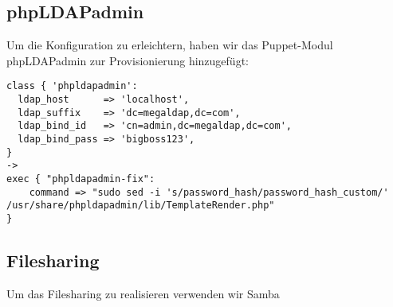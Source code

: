 \documentclass[main.tex]{subfiles}
\begin{document}
\subsection{phpLDAPadmin}
Um die Konfiguration zu erleichtern, haben wir das Puppet-Modul phpLDAPadmin zur 
Provisionierung hinzugefügt:

\begin{lstlisting}  
class { 'phpldapadmin':
  ldap_host      => 'localhost',
  ldap_suffix    => 'dc=megaldap,dc=com',
  ldap_bind_id   => 'cn=admin,dc=megaldap,dc=com',
  ldap_bind_pass => 'bigboss123',
}
->
exec { "phpldapadmin-fix":
    command => "sudo sed -i 's/password_hash/password_hash_custom/' /usr/share/phpldapadmin/lib/TemplateRender.php"
}
\end{lstlisting}

\subsection{Filesharing}
Um das Filesharing zu realisieren verwenden wir Samba
\end{document}
